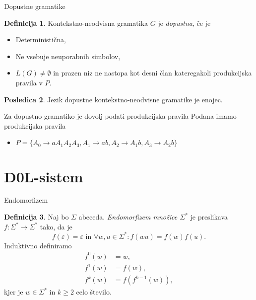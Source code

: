 \documentclass{beamer}
\theoremstyle{definition} %
\newtheorem{definicija}{Definicija}[section]
\newtheorem{posledica}[definicija]{Posledica}
\begin{document}
\begin{frame}{Dopustne gramatike}
    \begin{definicija}
        Kontekstno-neodvisna gramatika $G$ je \textit{dopustna}, če je
        \begin{itemize}
            \item Deterministična,
            \item Ne vsebuje neuporabnih simbolov,
            \item  $ L(G) \neq \emptyset $ in prazen niz ne nastopa kot desni član kateregakoli produkcijska pravila v $ P $.
        \end{itemize}
    \end{definicija}
    \pause
    \begin{posledica}
        Jezik dopustne kontekstno-neodvisne gramatike je enojec.
    \end{posledica}
\end{frame}

\begin{frame}
    \begin{exampleblock}{Za dopustno gramatiko je dovolj podati produkcijska pravila}
        Podana imamo produkcijska pravila 
        \begin{itemize}
            \item $ P = \{ A_0 \rightarrow aA_1A_2A_3, A_1 \rightarrow ab, A_2 \rightarrow A_1b, A_3 \rightarrow A_2b \} $ 
        \end{itemize}
        \pause
        \pause
        \pause
    \end{exampleblock}
\end{frame}

\section{D0L-sistem}

\begin{frame}{Endomorfizem}
    \begin{definicija}
        Naj bo $ \Sigma $ abeceda. \textit{Endomorfizem množice $ \Sigma^* $} je preslikava $ f \colon \Sigma^* \to \Sigma^* $
        tako, da je
        \[
            f(\varepsilon) = \varepsilon \text{ in } \forall w,u \in \Sigma^* \colon f(wu) = f(w)f(u).
        \]
        \pause
        Induktivno definiramo
        \begin{align*}
            f^0(w) &= w, \\
            f^1(w) &= f(w), \\
            f^k(w) &= f(f^{k-1}(w)),
        \end{align*}
        kjer je $ w \in \Sigma^* $ in $ k \geq 2 $ celo število.
    \end{definicija}
\end{frame}
\end{document}
